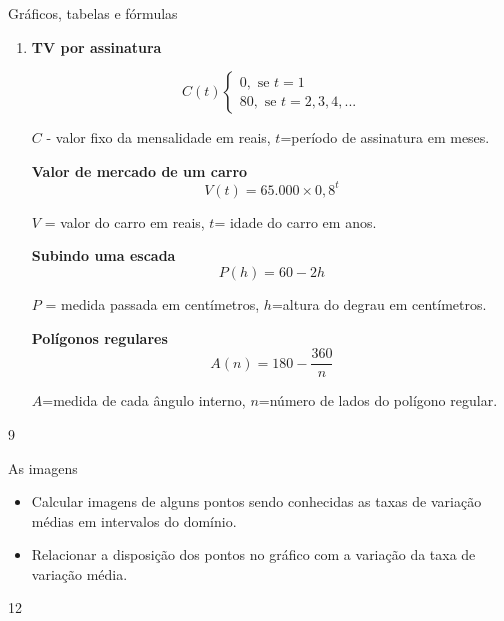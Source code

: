 \begin{answer}{Gráficos, tabelas e fórmulas}
{\begin{enumerate}
\item \textbf{TV por assinatura}

\[C(t)
\begin{cases}
0,\text{ se } t=1\\
80,\text{ se } t=2,3,4,...
\end{cases}
\]
\begin{center}
$C$ - valor fixo da mensalidade em reais, $t$=período de assinatura em meses.
\end{center}

\clearpage
\textbf{Valor de mercado de um carro}
\begin{equation*}
V(t)=65.000\times 0,8^t
\end{equation*}
\begin{center}
$V$ = valor do carro em reais, $t$= idade do carro em anos.
\end{center}

\textbf{Subindo uma escada}
\begin{equation*}
P(h)=60-2h
\end{equation*}
\begin{center}
$P$ = medida passada em centímetros, $h$=altura do degrau em centímetros.
\end{center}

\textbf{Polígonos regulares}
\begin{equation*}
A(n)=180-\frac{360}{n}
\end{equation*}
\begin{center}
$A$=medida de cada ângulo interno, $n$=número de lados do polígono regular.
\end{center}
\end{enumerate}
}{9}
\end{answer}
\clearmargin
\begin{objectives}{As imagens}
{
\begin{itemize}

\item  Calcular imagens de alguns pontos sendo conhecidas as taxas de variação médias em intervalos do domínio.

\item Relacionar a disposição dos pontos no gráfico com a variação da taxa de variação média.

\end{itemize}
}{1}{2}
\end{objectives}
\marginpar{\vspace{-2em}}
